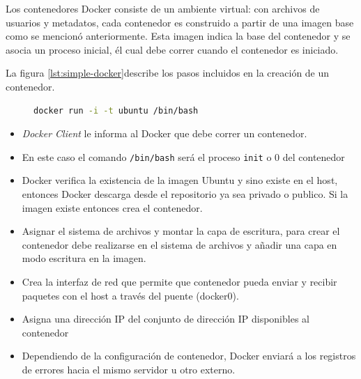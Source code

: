 Los contenedores Docker consiste de un ambiente virtual: con archivos de usuarios y metadatos, cada contenedor es construido a partir de una imagen base como se mencionó anteriormente. 
Esta imagen indica la base del contenedor y se asocia un proceso inicial, él cual debe correr cuando el contenedor es iniciado.

La figura \ref{lst:simple-docker}describe los pasos incluidos en la creación de un contenedor.

\begin{figure}
	\begin{lstlisting}[caption={Ejemplo de la ejecución de un contenedor utilizando la imagen Docker},label={lst:simple-docker},language=bash]
	docker run -i -t ubuntu /bin/bash
\end{lstlisting}
\end{figure}

	\begin{itemize}
		\item \emph{Docker Client} le informa al Docker que debe correr un contenedor.
		\item En este caso el comando \texttt{/bin/bash} será el proceso \texttt{init} o 0 del contenedor
		\item Docker verifica la existencia de la imagen Ubuntu y sino existe en el host, entonces Docker descarga desde el repositorio ya sea privado o publico. Si la imagen existe entonces crea el contenedor.
		\item Asignar el sistema de archivos y montar la capa de escritura, para crear el contenedor debe realizarse en el sistema de archivos y añadir una capa en modo escritura en la imagen.
		\item Crea la interfaz de red que permite que contenedor pueda enviar y recibir paquetes con el host a través del puente (docker0).
		\item Asigna una dirección IP del conjunto de dirección IP disponibles al contenedor
		\item Dependiendo de la configuración de contenedor, Docker enviará a los registros de errores hacia el mismo servidor u otro externo.
	\end{itemize}


